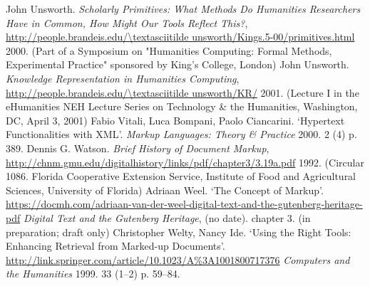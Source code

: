 \begin{bibitemlist}{1}
\label{Unsworth2000}John Unsworth. \textit{Scholarly Primitives: What Methods Do Humanities Researchers Have in Common, How Might Our Tools Reflect This?},  \url{http://people.brandeis.edu/\textasciitilde unsworth/Kings.5-00/primitives.html} 2000.  (Part of a Symposium on "Humanities Computing: Formal Methods, Experimental Practice" sponsored by King's College, London)
\label{Unsworth2001}John Unsworth. \textit{Knowledge Representation in Humanities Computing},  \url{http://people.brandeis.edu/\textasciitilde unsworth/KR/} 2001.  (Lecture I in the eHumanities NEH Lecture Series on Technology \& the Humanities, Washington, DC, April 3, 2001)
\label{Vitalietal2000}Fabio Vitali, Luca Bompani, Paolo Ciancarini. ‘Hypertext Functionalities with XML’. \textit{Markup Languages: Theory \& Practice} 2000. 2  (4)  p. 389. 
\label{Watson1992}Dennis G. Watson. \textit{Brief History of Document Markup},  \url{http://chnm.gmu.edu/digitalhistory/links/pdf/chapter3/3.19a.pdf} 1992.  (Circular 1086. Florida Cooperative Extension Service, Institute of Food and Agricultural Sciences, University of Florida)
\label{Weelnodate}Adriaan Weel. ‘The Concept of Markup’.  \url{https://docmh.com/adriaan-van-der-weel-digital-text-and-the-gutenberg-heritage-pdf} \textit{Digital Text and the Gutenberg Heritage}, (no date). chapter 3.  (in preparation; draft only)
\label{WeltyandIde1999}Christopher Welty, Nancy Ide. ‘Using the Right Tools: Enhancing Retrieval from Marked-up Documents’.   \url{http://link.springer.com/article/10.1023/A\%3A1001800717376} \textit{Computers and the Humanities} 1999. 33  (1–2)  p. 59–84. 
\end{bibitemlist}

